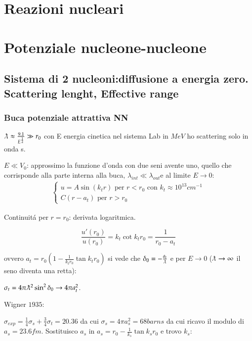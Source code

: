 \documentclass[main.tex]{subfiles}
\begin{document}
 \chapter{Reazioni nucleari}
 
 \chapter{Potenziale nucleone-nucleone}
 
\section{Sistema di 2 nucleoni:diffusione a energia zero. Scattering lenght, Effective range}

\subsection{Buca potenziale attrattiva NN}
$\lambdabar\approx\frac{9.1}{E^{\frac{1}{2}}}\gg r_0$ con E energia cinetica nel sistema Lab in $MeV$ ho scattering solo in onda s.

$E\ll V_0$: approssimo la funzione d'onda con due seni avente uno, quello che corrisponde alla parte interna alla buca,  $\lambda_{int}\ll\lambda_{out}$e al limite $E\rightarrow 0$:
\begin{align*}
\left\{\begin{array}{c}u=A\sin{(k_tr)} \text{ per   $r<r_0$ con } k_t\approx 10^{13}cm^{-1}\\ C(r-a_t) \text{ per   $r>r_0$}\end{array}\right.
\end{align*}

Continuit\'a per $r=r_0$: derivata logaritmica.

\begin{equation*}
\frac{u'(r_0)}{u(r_0)}=k_t\cot{k_tr_0}=\frac{1}{r_0-a_t}
\end{equation*}

ovvero $a_t=r_0(1-\frac{1}{k_tr_0}\tan{k_tr_0})$ si vede che $\delta_0=-\frac{a_t}{\lambdabar}$ e per $E\rightarrow0$ ($\lambdabar\rightarrow\infty$ il seno diventa una retta):

$\sigma_t=4\pi\lambdabar^2\sin^2{\delta_0}\rightarrow4\pi a_t^2$.

Wigner $1935$:

$\sigma_{exp}=\frac{1}{4}\sigma_s+\frac{3}{4}\sigma_t=20.36$ da cui $\sigma_s=4\pi a_s^2=68 barns$ da cui ricavo il modulo di $a_s=23.6fm$. Sostituisco $a_s$ in $a_s=r_0-\frac{1}{k_s}\tan{k_sr_0}$ e trovo $k_s$:
\end{document}
